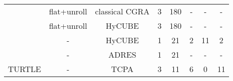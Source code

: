 \begin{table}
{\begin{tabular}{|l|c|c|c|c|c|c|c|}
 \rowcolor{darkRed!50}{Morpher}                       & {flat+unroll}                        & classical CGRA                            & 3                              & 180                           & -                          & -                                   & -\\
 \rowcolor{darkRed!50}{Morpher}                       & {flat+unroll}                        & HyCUBE                               & 3                              & 180                           & -                          & -                                   & -\\ 
 \rowcolor{darkOrange!50}{CGRA-ME}                    & {-}                                  & HyCUBE                               & 1                              & 21                            & 2                          & 11                                  & 2 \\
 \rowcolor{darkRed!50}{Pillars}                       & {-}                                  & ADRES                                & 1                              & 21                            & -                          & -                                   & - \\ 
 {TURTLE}                                               & {-}                                  & TCPA                               & 3                              & 11                            & 6                          & 0                                   & 11 \\ \hline
        \end{tabular}
    }
\end{table}


